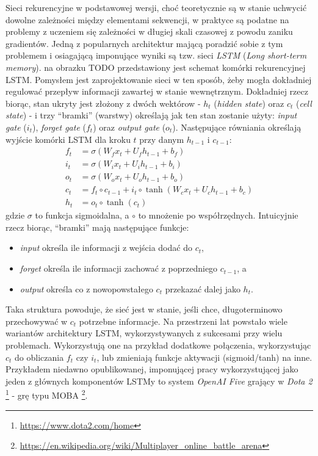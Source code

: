 \documentclass[magisterska]{pracamgr}
\begin{document}
Sieci rekurencyjne w podstawowej wersji, choć teoretycznie są w stanie uchwycić dowolne zależności między elementami sekwencji, w praktyce są podatne na problemy z uczeniem się zależności w długiej skali czasowej z powodu zaniku gradientów. Jedną z popularnych architektur mającą poradzić sobie z tym problemem i osiagającą imponujące wyniki są tzw. sieci \emph{LSTM} (\textit{Long short-term memory}). na obrazku TODO przedstawiony jest schemat komórki rekurencyjnej LSTM. Pomysłem jest zaprojektowanie sieci w ten sposób, żeby mogła dokładniej regulować przepływ informacji zawartej w stanie wewnętrznym. Dokładniej rzecz biorąc, stan ukryty jest złożony z dwóch wektórow - $h_t$ (\textit{hidden state}) oraz $c_t$ (\textit{cell state}) - i trzy "`bramki"' (warstwy) określają jak ten stan zostanie użyty: \emph{input gate} ($i_t$), \emph{forget gate} ($f_t$) oraz \emph{output gate} ($o_t$). Następujące równiania określają wyjście komórki LSTM dla kroku $t$ przy danym $h_{t-1}$ i $c_{t-1}$:
\begin{align*}
    f_t &= \sigma(W_f x_t + U_f h_{t-1} + b_f) \\
    i_t &= \sigma(W_i x_t + U_i h_{t-1} + b_i) \\
    o_t &= \sigma(W_o x_t + U_o h_{t-1} + b_o) \\
    c_t &= f_t \circ c_{t-1} + i_t \circ \tanh(W_c x_t + U_c h_{t-1} + b_c) \\
    h_t &= o_t \circ \tanh(c_t)
\end{align*}
gdzie $\sigma$ to funkcja sigmoidalna, a $\circ$ to mnożenie po współrzędnych. Intuicyjnie rzecz biorąc, "`bramki"' mają następujące funkcje:
\begin{itemize}
    \setlength\itemsep{0em}
    \item \textit{input} określa ile informacji z wejścia dodać do $c_t$,
    \item \textit{forget} określa ile informacji zachować z poprzedniego $c_{t-1}$, a
    \item \textit{output} określa co z nowopowstałego $c_t$ przekazać dalej jako $h_t$.
\end{itemize}
Taka struktura powoduje, że sieć jest w stanie, jeśli chce, długoterminowo przechowywać w $c_t$ potrzebne informacje. Na przestrzeni lat powstało wiele wariantów architektury LSTM, wykorzystywanych z sukcesami przy wielu problemach. Wykorzystują one na przykład dodatkowe połączenia, wykorzystując $c_t$ do obliczania $f_t$ czy $i_t$, lub zmieniają funkcje aktywacji (sigmoid/tanh) na inne. Przykładem niedawno opublikowanej, imponującej pracy wykorzystującej jako jeden z głównych komponentów LSTMy to system \emph{OpenAI Five} grający w \emph{Dota 2} \footnote{\url{https://www.dota2.com/home}} - grę typu MOBA \footnote{\url{https://en.wikipedia.org/wiki/Multiplayer_online_battle_arena}}.
\end{document}
